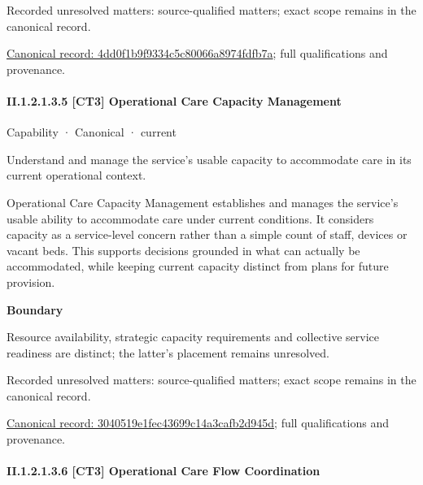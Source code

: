 {\small Recorded unresolved matters: source-qualified matters; exact scope remains in the canonical record.}\par
{\footnotesize \href{../../../../continuum/strategy/capability/4dd0f1b9f9334c5c80066a8974fdfb7a.md}{Canonical record: 4dd0f1b9f9334c5c80066a8974fdfb7a}; full qualifications and provenance.}\par
\paragraph*{II.1.2.1.3.5 [CT3] Operational Care Capacity Management}
\label{navigation:II.1.2.1.3.5}

\label{element:3040519e1fec43699c14a3cafb2d945d}
{\small Capability · Canonical · current}\par

Understand and manage the service’s usable capacity to accommodate care in its current operational context.



Operational Care Capacity Management establishes and manages the service's usable ability to accommodate care under current conditions. It considers capacity as a service-level concern rather than a simple count of staff, devices or vacant beds. This supports decisions grounded in what can actually be accommodated, while keeping current capacity distinct from plans for future provision.



\textbf{Boundary}



Resource availability, strategic capacity requirements and collective service readiness are distinct; the latter's placement remains unresolved.


{\small Recorded unresolved matters: source-qualified matters; exact scope remains in the canonical record.}\par
{\footnotesize \href{../../../../continuum/strategy/capability/3040519e1fec43699c14a3cafb2d945d.md}{Canonical record: 3040519e1fec43699c14a3cafb2d945d}; full qualifications and provenance.}\par
\paragraph*{II.1.2.1.3.6 [CT3] Operational Care Flow Coordination}
\label{navigation:II.1.2.1.3.6}

